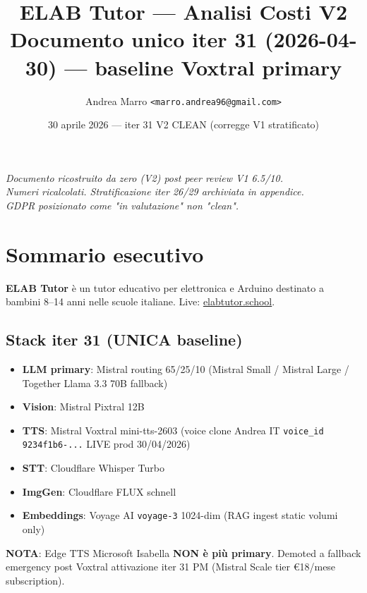 \documentclass[12pt,a4paper]{article}
\title{\color{elabnavy}\textbf{ELAB Tutor --- Analisi Costi V2}\\
\large Documento unico iter 31 (2026-04-30) --- baseline Voxtral primary}
\author{Andrea Marro \texttt{<marro.andrea96@gmail.com>}}
\date{30 aprile 2026 --- iter 31 V2 CLEAN (corregge V1 stratificato)}
\begin{document}
\maketitle
\thispagestyle{empty}

\begin{center}
\color{elabgray}\textit{Documento ricostruito da zero (V2) post peer review V1 6.5/10. \\
Numeri ricalcolati. Stratificazione iter 26/29 archiviata in appendice. \\
GDPR posizionato come "in valutazione" non "clean".}
\end{center}

\vspace{0.5cm}

\tableofcontents
\newpage

\section{Sommario esecutivo}

\textbf{ELAB Tutor} è un tutor educativo per elettronica e Arduino destinato a bambini 8--14 anni nelle scuole italiane. Live: \href{https://www.elabtutor.school}{elabtutor.school}.

\subsection*{Stack iter 31 (UNICA baseline)}

\begin{itemize}[leftmargin=*]
  \item \textbf{LLM primary}: Mistral routing 65/25/10 (Mistral Small / Mistral Large / Together Llama 3.3 70B fallback)
  \item \textbf{Vision}: Mistral Pixtral 12B
  \item \textbf{TTS}: Mistral Voxtral mini-tts-2603 (voice clone Andrea IT \texttt{voice\_id 9234f1b6-...} LIVE prod 30/04/2026)
  \item \textbf{STT}: Cloudflare Whisper Turbo
  \item \textbf{ImgGen}: Cloudflare FLUX schnell
  \item \textbf{Embeddings}: Voyage AI \texttt{voyage-3} 1024-dim (RAG ingest static volumi only)
\end{itemize}

\textbf{NOTA}: Edge TTS Microsoft Isabella \textbf{NON è più primary}. Demoted a fallback emergency post Voxtral attivazione iter 31 PM (Mistral Scale tier €18/mese subscription).
\end{document}
